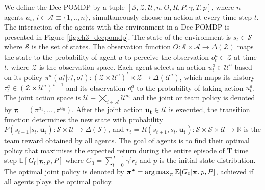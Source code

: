 We define the Dec-POMDP by a tuple $[\mathcal{S}, \mathcal{Z}, \mathcal{U}, n, O, R, P, \gamma, T, p]$, where $n$ agents $a_i$, $i \in \mathcal{A} \equiv \{1,..,n\}$, simultaneously choose an action at every time step $t$.
The interaction of the agents with the environment in a Dec-POMDP is presented in Figure \ref{fig:ch3_decpomdp}.
The state of the environment is $s_t \in \mathcal{S}$ where $\mathcal{S}$ is the set of states.
The observation function $O:\mathcal{S} \times \mathcal{A} \rightarrow \Delta(\mathcal{Z})$ maps the state to the probability of agent $a$ to perceive the observation $o_t^{a} \in \mathcal{Z}$ at time $t$, where $\mathcal{Z}$ is the observation space.
Each agent selects an action $u_t^{a} \in \mathcal{U}^{a}$ based on its policy $\pi^{a}(u_t^{a}|\tau_t^{a},o_t^{a}): (\mathcal{Z} \times \mathcal{U}^a)^t \times \mathcal{Z}\rightarrow \Delta(\mathcal{U}^a)$, which maps its history $\tau_t^{a} \in (\mathcal{Z} \times \mathcal{U}^a)^{t-1}$ and its observation $o_t^{a}$ to the probability of taking action $u_t^{a}$. 
The joint action space is $\mathcal{U} \equiv \bigtimes_{i \in \mathcal{A}} \mathcal{U}^{a_i}$ and the joint or team policy is denoted by $\mathbf{\pi}=(\pi^{a_1},...,\pi^{a_n})$.
After the joint action $\mathbf{u_t} \in \mathcal{U}$ is executed, the transition function determines the new state with probability $P(s_{t+1}|s_t, \mathbf{u_t}): \mathcal{S} \times\mathcal{U} \rightarrow  \Delta(\mathcal{S}) $, and $r_t=R(s_{t+1}, s_t, \mathbf{u_t}): \mathcal{S} \times \mathcal{S} \times \mathcal{U} \rightarrow \mathbb{R}$ is the team reward obtained by all agents.
The goal of agents is to find their optimal policy that maximises the expected return during the entire episode of T time step $\mathbb{E}[G_0|\mathbf{\pi}, p, P]$ where $G_0=\sum_{t=0}^{T-1} \gamma^{t} r_{t}$ and $p$ is the initial state distribution.
The optimal joint policy is denoted by $\mathbf{\pi^{*}} =\argmax_{\mathbf{\pi}} \mathbb{E}[G_0|\mathbf{\pi}, p, P]$, achieved if all agents plays the optimal policy.

